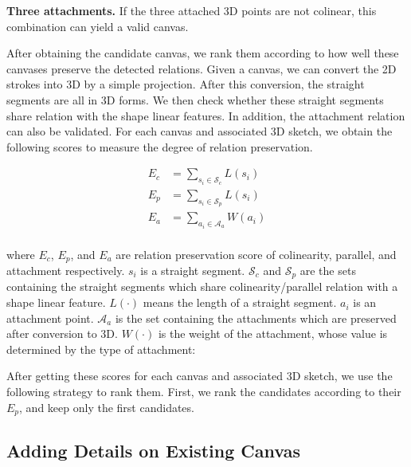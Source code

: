 \textbf{Three attachments.} If the three attached 3D points are not colinear, this combination can yield a valid canvas.

After obtaining the candidate canvas, we rank them according to how well these canvases preserve the detected relations. Given a canvas, we can convert the 2D strokes into 3D by a simple projection. After this conversion, the straight segments are all in 3D forms. We then check whether these straight segments share relation with the shape linear features. In addition, the attachment relation can also be validated. For each canvas and associated 3D sketch, we obtain the following scores to measure the degree of relation preservation.

\begin{equation}
\begin{aligned}
E_c &= \sum_{s_i\in \mathcal{S}_c} L(s_i)\\
E_p &= \sum_{s_i\in \mathcal{S}_p} L(s_i)\\
E_a &= \sum_{a_i\in \mathcal{A}_a} W(a_i)\\
\end{aligned}
\end{equation}

where $E_c$, $E_p$, and $E_a$ are relation preservation score of colinearity, parallel, and attachment respectively. $s_i$ is a straight segment. $\mathcal{S}_c$ and $\mathcal{S}_p$ are the sets containing the straight segments which share colinearity/parallel relation with a shape linear feature. $L(\cdot)$ means the length of a straight segment. $a_i$ is an attachment point. $\mathcal{A}_a$ is the set containing the attachments which are preserved after conversion to 3D. $W(\cdot)$ is the weight of the attachment, whose value is determined by the type of attachment: 

After getting these scores for each canvas and associated 3D sketch, we use the following strategy to rank them. First, we rank the candidates according to their $E_p$, and keep only the first  candidates. 


\subsection{Adding Details on Existing Canvas}




